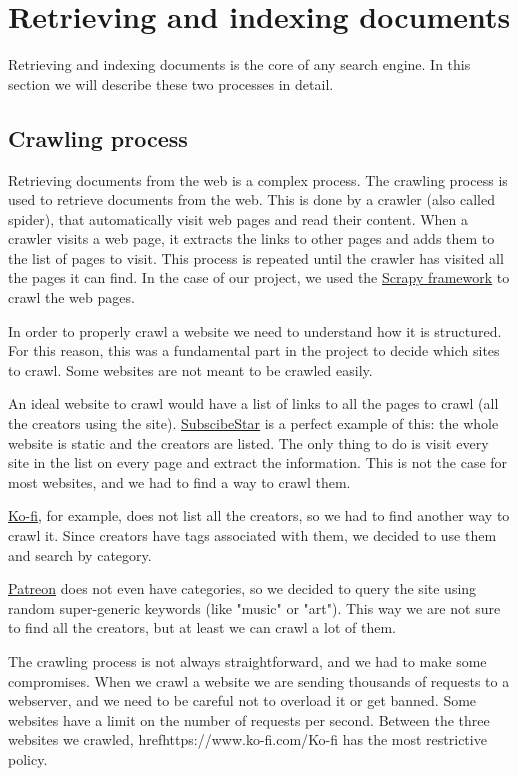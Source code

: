 \documentclass[tikz,14pt]{article}
\begin{document}
\section{Retrieving and indexing documents} \label{sec:retrieving}
Retrieving and indexing documents is the core of any search engine. In this section we will describe these two processes in detail.




\subsection{Crawling process} \label{sec:crawling}
Retrieving documents from the web is a complex process. 
The crawling process is used to retrieve documents from the web.
This is done by a crawler (also called spider), that automatically visit web pages and read their content.
When a crawler visits a web page, it extracts the links to other pages and adds them to the list of pages to visit.
This process is repeated until the crawler has visited all the pages it can find.
In the case of our project, we used the \href{https://scrapy.org/}{Scrapy framework} to crawl the web pages.

In order to properly crawl a website we need to understand how it is structured.
For this reason, this was a fundamental part in the project to decide which sites to crawl.
Some websites are not meant to be crawled easily.

An ideal website to crawl would have a list of links to all the pages to crawl (all the creators using the site).
\href{https://www.subscribestar.com/stars?_page=true&page=1}{SubscibeStar} is a perfect example of this:
the whole website is static and the creators are listed. 
The only thing to do is visit every site in the list on every page and extract the information.
This is not the case for most websites, and we had to find a way to crawl them.


\href{https://www.ko-fi.com/}{Ko-fi}, for example, does not list all the creators, so we had to find another way to crawl it.
Since creators have tags associated with them, we decided to use them and search by category.

\href{https://www.patreon.com/}{Patreon} does not even have categories, 
so we decided to query the site using random super-generic keywords (like "music" or "art").
This way we are not sure to find all the creators, but at least we can crawl a lot of them.

The crawling process is not always straightforward, and we had to make some compromises.
When we crawl a website we are sending thousands of requests to a webserver, and we need to be careful not to overload it or get banned.
Some websites have a limit on the number of requests per second.
Between the three websites we crawled, href{https://www.ko-fi.com/}{Ko-fi} has the most restrictive policy.
\end{document}
